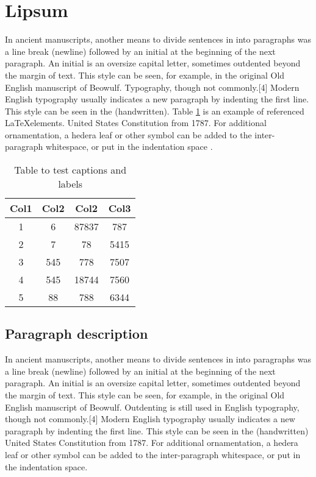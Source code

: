 \section{Lipsum}

In ancient manuscripts, another means to divide sentences in into paragraphs was a line break (newline) followed by an initial at the beginning of the next paragraph. An initial is an oversize capital letter, sometimes outdented beyond the margin of text. This style can be seen, for example, in the original Old English manuscript of Beowulf. Typography, though not commonly.[4] Modern English typography usually indicates a new paragraph by indenting the first line. This style can be seen in the (handwritten). Table \ref{table:2} is an example of referenced \LaTeX elements. United States Constitution from 1787. For additional ornamentation, a hedera leaf or other symbol can be added to the inter-paragraph whitespace, or put in the indentation space \cite{einstein}.

\begin{table}[h!]
    \centering
    \caption{Table to test captions and labels}
    \begin{tabular}{||c c c c||} 
     \hline
     Col1 & Col2 & Col2 & Col3 \\ [0.5ex] 
    \hline\hline
     1 & 6 & 87837 & 787 \\ 
     2 & 7 & 78 & 5415 \\
     3 & 545 & 778 & 7507 \\
     4 & 545 & 18744 & 7560 \\
     5 & 88 & 788 & 6344 \\ [1ex] 
     \hline
    \end{tabular}
    \label{table:2}
\end{table}

\subsection{Paragraph description}
In ancient manuscripts, another means to divide sentences in into paragraphs was a line break (newline) followed by an initial at the beginning of the next paragraph. An initial is an oversize capital letter, sometimes outdented beyond the margin of text. This style can be seen, for example, in the original Old English manuscript of Beowulf. Outdenting is still used in English typography, though not commonly.[4] Modern English typography usually indicates a new paragraph by indenting the first line. This style can be seen in the (handwritten) United States Constitution from 1787. For additional ornamentation, a hedera leaf or other symbol can be added to the inter-paragraph whitespace, or put in the indentation space.


